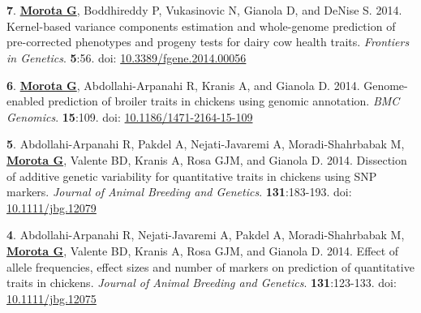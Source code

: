 \documentclass[margin,line,10pt]{res}
\newenvironment{list1}{
  \begin{list}{\ding{113}}{%
      \setlength{\itemsep}{0in}
      \setlength{\parsep}{0in} \setlength{\parskip}{0in}
      \setlength{\topsep}{0in} \setlength{\partopsep}{0in} 
      \setlength{\leftmargin}{0.17in}}}{\end{list}}
\begin{document}
\begin{resume}
\begin{list1}
\end{list1}


\section{}

\begin{list1}


\item [{\bf 7}.]  {\bf \underline{Morota G}}, Boddhireddy P, Vukasinovic N, Gianola D, and DeNise S.  2014. Kernel-based variance components estimation and  whole-genome prediction of pre-corrected phenotypes and progeny tests for dairy cow health traits. \emph{Frontiers in Genetics}. {\bf 5}:56. doi: \textcolor{blue}{\href{http://dx.doi.org/10.3389/fgene.2014.00056}{10.3389/fgene.2014.00056}} 

\vspace{0.5cm}

\item [{\bf 6}.]  {\bf \underline{Morota G}}, Abdollahi-Arpanahi R, Kranis A, and Gianola D. 2014.   
     Genome-enabled prediction of broiler traits in chickens using genomic annotation. \emph{BMC Genomics}. {\bf 15}:109. doi: \textcolor{blue}{\href{http://dx.doi.org/10.1186/1471-2164-15-109}{10.1186/1471-2164-15-109}}
    

\vspace{0.5cm}

\item [{\bf 5}.]  Abdollahi-Arpanahi R, Pakdel A, Nejati-Javaremi A, Moradi-Shahrbabak M, 
     {\bf \underline{Morota G}}, Valente BD, Kranis A, Rosa GJM, and Gianola D. 2014.
     Dissection of additive genetic variability for quantitative traits in chickens using SNP markers. \emph{Journal of Animal Breeding and Genetics}. \textbf{131}:183-193. doi: \textcolor{blue}{\href{http://dx.doi.org/10.1111/jbg.12079}{10.1111/jbg.12079}}

\vspace{0.5cm}

\item [{\bf 4}.]  Abdollahi-Arpanahi R,  Nejati-Javaremi A,  Pakdel A, Moradi-Shahrbabak M, 
     {\bf \underline{Morota G}}, Valente BD, Kranis A, Rosa GJM, and Gianola D. 2014.   
     Effect of allele frequencies, effect sizes and number of markers on prediction of quantitative 
     traits in chickens. \emph{Journal of Animal Breeding and Genetics}. \textbf{131}:123-133. doi: \textcolor{blue}{\href{http://dx.doi.org/10.1111/jbg.12075}{10.1111/jbg.12075}}
\end{list1}




\end{resume}
\end{document}

